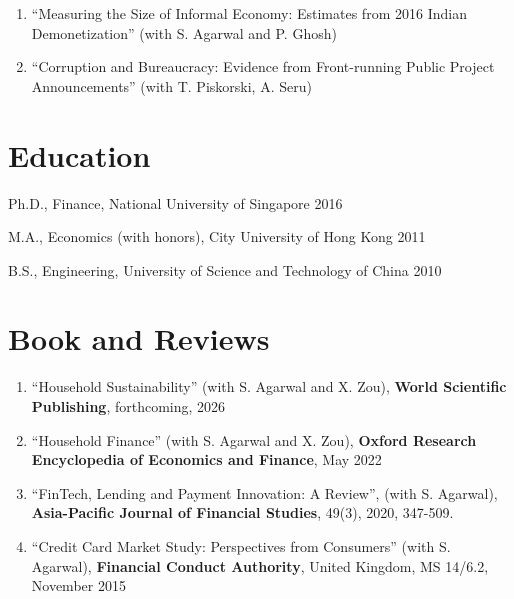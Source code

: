 \documentclass[margin,line]{res}
\newenvironment{list1}{
  \begin{list}{\ding{113}}{%
      \setlength{\itemsep}{0in}
      \setlength{\parsep}{0in} \setlength{\parskip}{0in}
      \setlength{\topsep}{0in} \setlength{\partopsep}{0in} 
      \setlength{\leftmargin}{0.17in}}}{\end{list}}
\begin{document}
\begin{resume}
\begin{enumerate}
\item %
``Measuring the Size of Informal Economy: Estimates from 2016 Indian Demonetization'' (with S. Agarwal and P. Ghosh)
\vspace*{0.2cm}

\item %
``Corruption and Bureaucracy: Evidence from Front-running Public Project Announcements'' (with T. Piskorski, A. Seru)
\vspace*{0.2cm} 
\fi
\end{enumerate}

\section{\sc Education}
\begin{list1}
	\item[] Ph.D., Finance, National University of Singapore \hfill 2016 
	\\
	\vspace*{-.1in}
	\item[] M.A., Economics (with honors), City University of Hong Kong \hfill 2011\\
	\vspace*{-.1in}
	\item[] B.S., Engineering, University of Science and Technology of China \hfill 2010
\end{list1}

\section{\sc Book and Reviews}
\begin{enumerate}
\item %
``Household Sustainability'' (with S. Agarwal and X. Zou), \textbf{World Scientific Publishing}, forthcoming, 2026
\vspace*{0.1cm}
\item %
``Household Finance'' (with S. Agarwal and X. Zou), \textbf{Oxford Research Encyclopedia of Economics and Finance}, May 2022
\vspace*{0.1cm} 	
\item %
``FinTech, Lending and Payment Innovation: A Review'', (with S. Agarwal), \textbf{Asia-Pacific Journal of Financial Studies}, 49(3), 2020, 347-509.
\vspace*{0.1cm} 	
	\item %
 ``Credit Card Market Study: Perspectives from Consumers'' (with S. Agarwal), \textbf{Financial Conduct Authority}, United Kingdom, MS 14/6.2, November 2015


\end{enumerate}
\end{resume}
\end{document}

